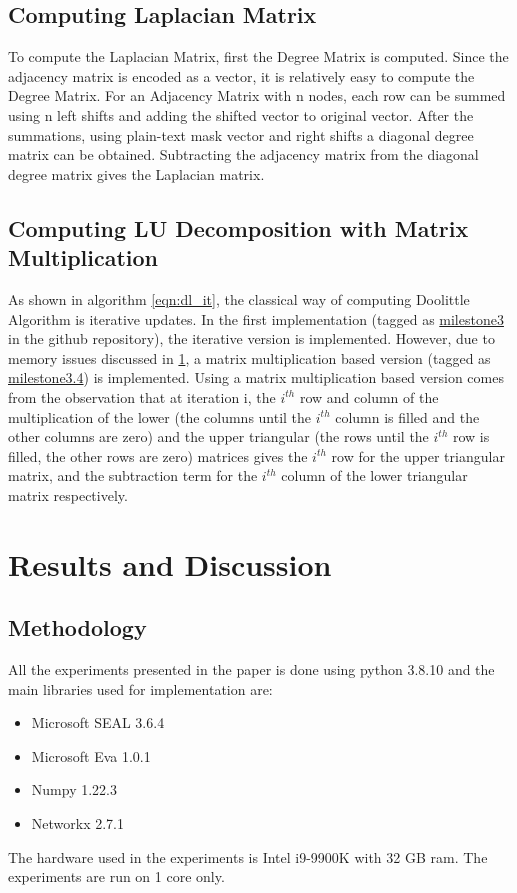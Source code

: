 \documentclass{winslabreport}
\begin{document}
\subsection{Computing Laplacian Matrix}
To compute the Laplacian Matrix, first the Degree Matrix is computed. Since the adjacency matrix is encoded as a vector, it is relatively easy to compute the Degree Matrix. For an Adjacency Matrix with n nodes, each row can be summed using n left shifts and adding the shifted vector to original vector. After the summations, using plain-text mask vector and right shifts a diagonal degree matrix can be obtained. Subtracting the adjacency matrix from the diagonal degree matrix gives the Laplacian matrix.
\subsection{Computing LU Decomposition with Matrix Multiplication}
As shown in algorithm \ref{eqn:dl_it}, the classical way of computing Doolittle Algorithm is iterative updates. In the first implementation (tagged as \href{https://github.com/ozgraslan/CENG519-Project/tree/milestone3}{milestone3} in the github repository), the iterative version is implemented. However, due to memory issues discussed in \ref{res_dis}, a matrix multiplication based version (tagged as \href{https://github.com/ozgraslan/CENG519-Project/tree/milestone3.4}{milestone3.4}) is implemented. Using a matrix multiplication based version comes from the observation that at iteration i, the $i^{th}$ row and column of the multiplication of the lower (the columns until the $i^{th}$ column is filled and the other columns are zero) and the upper triangular (the rows until the $i^{th}$ row is filled, the other rows are zero) matrices gives the $i^{th}$ row for the upper triangular matrix, and the subtraction term for the $i^{th}$ column of the lower triangular matrix respectively. 

\section{Results and Discussion}
\label{res_dis}
\subsection{Methodology}
All the experiments presented in the paper is done using python 3.8.10 and the main libraries used for implementation are:
\begin{itemize}
    \item Microsoft SEAL 3.6.4 
    \item Microsoft Eva 1.0.1
    \item Numpy 1.22.3
    \item Networkx 2.7.1
\end{itemize}
The hardware used in the experiments is Intel i9-9900K with 32 GB ram. The experiments are run on 1 core only.
\end{document}
